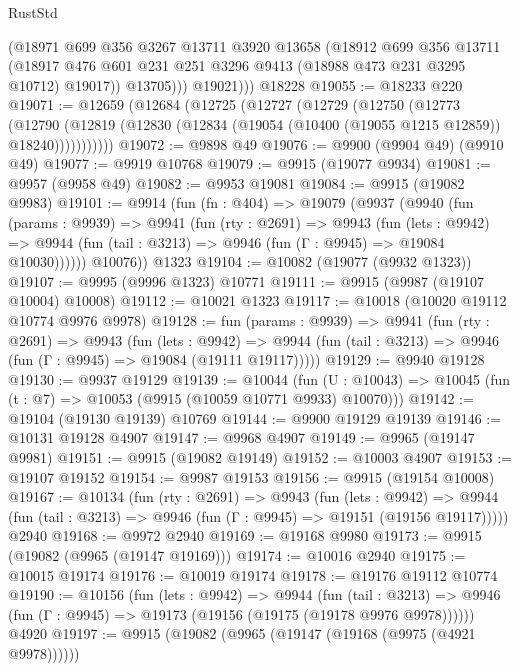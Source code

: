 \begin{lexlean}{RustStd}
\begin{coremodule}
              (@18971
                @699
                @356
                @3267
                @13711
                @3920
                @13658
                (@18912
                  @699
                  @356
                  @13711
                  (@18917 @476 @601 @231 @251 @3296 @9413 (@18988 @473 @231 @3295 @10712) @19017))
                @13705)))
          @19021)))
    @18228
@19055 := @18233 @220
@19071 := @12659
    (@12684
      (@12725
        (@12727
          (@12729
            (@12750
              (@12773
                (@12790
                  (@12819 (@12830 (@12834 (@19054 (@10400 (@19055 @1215 @12859)) @18240)))))))))))
@19072 := @9898 @49
@19076 := @9900 (@9904 @49) (@9910 @49)
@19077 := @9919 @10768
@19079 := @9915 (@19077 @9934)
@19081 := @9957 (@9958 @49)
@19082 := @9953 @19081
@19084 := @9915 (@19082 @9983)
@19101 := @9914
    (fun (fn : @404) =>
    @19079
      (@9937
        (@9940
          (fun (params : @9939) =>
          @9941
            (fun (rty : @2691) =>
            @9943
              (fun (lets : @9942) =>
              @9944 (fun (tail : @3213) => @9946 (fun (Γ : @9945) => @19084 @10030))))))
        @10076))
    @1323
@19104 := @10082 (@19077 (@9932 @1323))
@19107 := @9995 (@9996 @1323) @10771
@19111 := @9915 (@9987 (@19107 @10004) @10008)
@19112 := @10021 @1323
@19117 := @10018 (@10020 @19112 @10774 @9976 @9978)
@19128 := fun (params : @9939) =>
  @9941
    (fun (rty : @2691) =>
    @9943
      (fun (lets : @9942) =>
      @9944 (fun (tail : @3213) => @9946 (fun (Γ : @9945) => @19084 (@19111 @19117)))))
@19129 := @9940 @19128
@19130 := @9937 @19129
@19139 := @10044
    (fun (U : @10043) => @10045 (fun (t : @7) => @10053 (@9915 (@10059 @10771 @9933) @10070)))
@19142 := @19104 (@19130 @19139) @10769
@19144 := @9900 @19129 @19139
@19146 := @10131 @19128 @4907
@19147 := @9968 @4907
@19149 := @9965 (@19147 @9981)
@19151 := @9915 (@19082 @19149)
@19152 := @10003 @4907
@19153 := @19107 @19152
@19154 := @9987 @19153
@19156 := @9915 (@19154 @10008)
@19167 := @10134
    (fun (rty : @2691) =>
    @9943
      (fun (lets : @9942) =>
      @9944 (fun (tail : @3213) => @9946 (fun (Γ : @9945) => @19151 (@19156 @19117)))))
    @2940
@19168 := @9972 @2940
@19169 := @19168 @9980
@19173 := @9915 (@19082 (@9965 (@19147 @19169)))
@19174 := @10016 @2940
@19175 := @10015 @19174
@19176 := @10019 @19174
@19178 := @19176 @19112 @10774
@19190 := @10156
    (fun (lets : @9942) =>
    @9944
      (fun (tail : @3213) =>
      @9946 (fun (Γ : @9945) => @19173 (@19156 (@19175 (@19178 @9976 @9978))))))
    @4920
@19197 := @9915 (@19082 (@9965 (@19147 (@19168 (@9975 (@4921 @9978))))))

\end{coremodule}
\end{lexlean}
